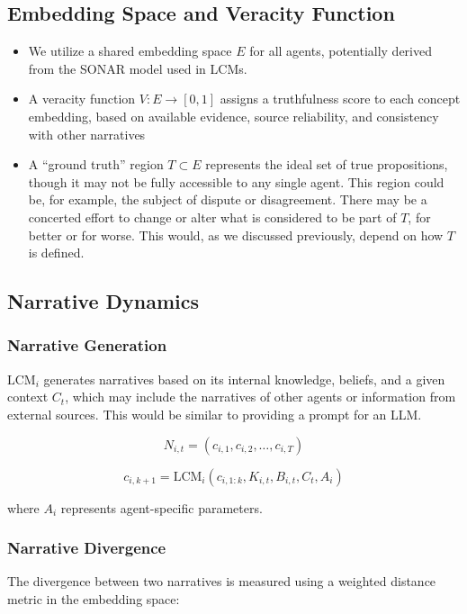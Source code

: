 \documentclass[12pt, a4paper]{article}
\begin{document}
\subsection{Embedding Space and Veracity Function}

\begin{itemize}
    \item We utilize a shared embedding space $E$ for all agents, potentially derived from the SONAR model used in LCMs.
    \item A veracity function $V : E \rightarrow [0, 1]$ assigns a truthfulness score to each concept embedding, based on available evidence, source reliability, and consistency with other narratives
    \item A ``ground truth'' region $T \subset E$ represents the ideal set of true propositions, though it may not be fully accessible to any single agent. This region could be, for example, the subject of dispute or disagreement. There may be a concerted effort to change or alter what is considered to be part of $T$, for better or for worse. This would, as we discussed previously, depend on how $T$ is defined.
\end{itemize}

 

\subsection{Narrative Dynamics}

\subsubsection{Narrative Generation}
$\text{LCM}_i$ generates narratives based on its internal knowledge, beliefs, and a given context $C_t$, which may include the narratives of other agents or information from external sources. This would be similar to providing a prompt for an LLM.

\begin{equation}
N_{i,t} = (c_{i,1}, c_{i,2}, \ldots, c_{i,T})
\end{equation}

\begin{equation}
c_{i,k+1} = \text{LCM}_i(c_{i,1:k}, K_{i,t}, B_{i,t}, C_t, A_i)
\end{equation}

where $A_i$ represents agent-specific parameters.


\subsubsection{Narrative Divergence}
The divergence between two narratives is measured using a weighted distance metric in the embedding space:
\end{document}
